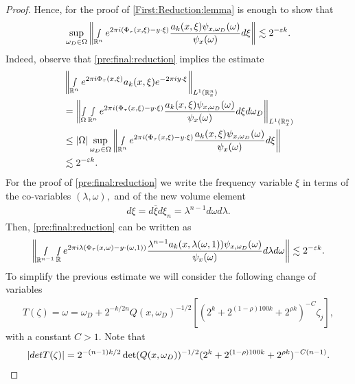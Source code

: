 \documentclass[12pt, reqno]{amsart}
\theoremstyle{definition}
\theoremstyle{remark}
\numberwithin{equation}{section}
\begin{document}
\begin{proof}
Hence, for the proof of \eqref{First:Reduction:lemma} is enough to show that 
 \begin{align}\label{pre:final:reduction}
     \sup_{\omega_D\in  \Omega}\left\Vert   \smallint\limits_{\mathbb{R}^n} e^{2\pi i(\Phi_\tau(x,\xi)-y\cdot \xi)} \frac{ a_k(x,\xi) \psi_{x,\omega_D}(\omega)  }{\psi_{x}(\omega)}  d\xi \right\Vert\lesssim 2^{-\varepsilon k}.
 \end{align}Indeed, observe that \eqref{pre:final:reduction} implies the estimate
 \begin{align*}
    &  \left\Vert \smallint\limits_{\mathbb{R}^n}e^{2\pi i\Phi_\tau(x,\xi)}a_k(x,\xi)e^{-2\pi i y\cdot \xi}    \right\Vert_{L^1(\mathbb{R}^n_x)}\\
    &= \left\Vert \smallint\limits_{\Omega } \smallint\limits_{\mathbb{R}^n} e^{2\pi i(\Phi_\tau(x,\xi)-y\cdot \xi)} \frac{ a_k(x,\xi) \psi_{x,\omega_D}(\omega)  }{\psi_{x}(\omega)}  d\xi d\omega_D    \right\Vert_{L^1(\mathbb{R}^n_x)}\\
    &\leq |\Omega| \sup_{\omega_D\in  \Omega}\left\Vert   \smallint\limits_{\mathbb{R}^n} e^{2\pi i(\Phi_\tau(x,\xi)-y\cdot \xi)} \frac{ a_k(x,\xi) \psi_{x,\omega_D}(\omega)  }{\psi_{x}(\omega)}  d\xi \right\Vert\\
    &\lesssim 2^{-\varepsilon k}.
 \end{align*}For the proof of \eqref{pre:final:reduction} we write the frequency variable $ \xi$ in terms of the co-variables $(\lambda,\omega),$ and of the new volume element
 \begin{align*}
     d\xi=d\overline{\xi}d\xi_n=\lambda^{n-1}d\omega d\lambda.
 \end{align*}Then, \eqref{pre:final:reduction} can be written as 
 \begin{align}\label{to:prove:lambda}
     \left\Vert   \smallint\limits_{\mathbb{R}^{n-1}}  \smallint\limits_{\mathbb{R}} e^{2\pi i\lambda(\Phi_\tau(x,\omega)-y\cdot (\omega,1) ) } \frac{ \lambda^{n-1}a_k(x,\lambda(\omega,1)) \psi_{x,\omega_D}(\omega)  }{\psi_{x}(\omega)}  d\lambda d\omega \right\Vert\lesssim 2^{-\varepsilon k}.
 \end{align}To simplify the previous estimate we will consider the following change of variables
 \begin{align*}
    T(\zeta)= \omega=\omega_D+2^{-k/2n}Q(x,\omega_D)^{-1/2}[(2^{ k}+2^{(1-\rho)100 k}+2^{\rho k})^{-C}\zeta_j] ,
 \end{align*} with a constant $C>1.$  Note that
 \begin{align}\label{determinant:Q}     |\textnormal{det}T(\zeta)|=2^{-(n-1)k/2}\det(Q(x,\omega_D))^{-1/2}(2^{ k}+2^{(1-\rho)100 k}+2^{\rho k})^{-C(n-1)}.

\end{align}
\end{proof}
\end{document}

